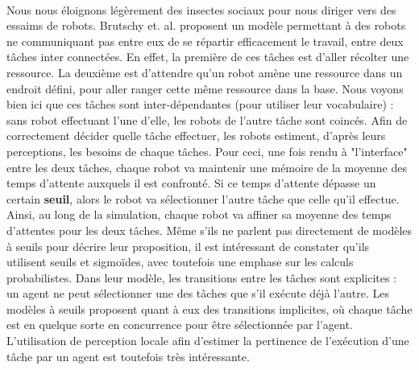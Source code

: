         \paragraph{}
		Nous nous éloignons légèrement des insectes sociaux pour nous diriger vers des essaims de robots. Brutschy et. al. \cite{brutschy_self-organized_2014} proposent un modèle permettant à des robots ne communiquant pas entre eux de se répartir efficacement le travail, entre deux tâches inter connectées. En effet, la première de ces tâches est d'aller récolter une ressource. La deuxième est d'attendre qu'un robot amène une ressource dans un endroit défini, pour aller ranger cette même ressource dans la base. Nous voyons bien ici que ces tâches sont inter-dépendantes (pour utiliser leur vocabulaire) : sans robot effectuant l'une d'elle, les robots de l'autre tâche sont coincés. Afin de correctement décider quelle tâche effectuer, les robots estiment, d'après leurs perceptions, les besoins de chaque tâches. Pour ceci, une fois rendu à "l'interface" entre les deux tâches, chaque robot va maintenir une mémoire de la moyenne des temps d'attente auxquels il est confronté. Si ce temps d'attente dépasse un certain \textbf{seuil}, alors le robot va sélectionner l'autre tâche que celle qu'il effectue. Ainsi, au long de la simulation, chaque robot va affiner sa moyenne des temps d'attentes pour les deux tâches. Même s'ils ne parlent pas directement de modèles à seuils pour décrire leur proposition, il est intéressant de constater qu'ils utilisent seuils et sigmoïdes, avec toutefois une emphase sur les calculs probabilistes. Dans leur modèle, les transitions entre les tâches sont explicites : un agent ne peut sélectionner une des tâches que s'il exécute déjà l'autre. Les modèles à seuils proposent quant à eux des transitions implicites, où chaque tâche est en quelque sorte en concurrence pour être sélectionnée par l'agent. L'utilisation de perception locale afin d'estimer la pertinence de l'exécution d'une tâche par un agent est toutefois très intéressante.
        
